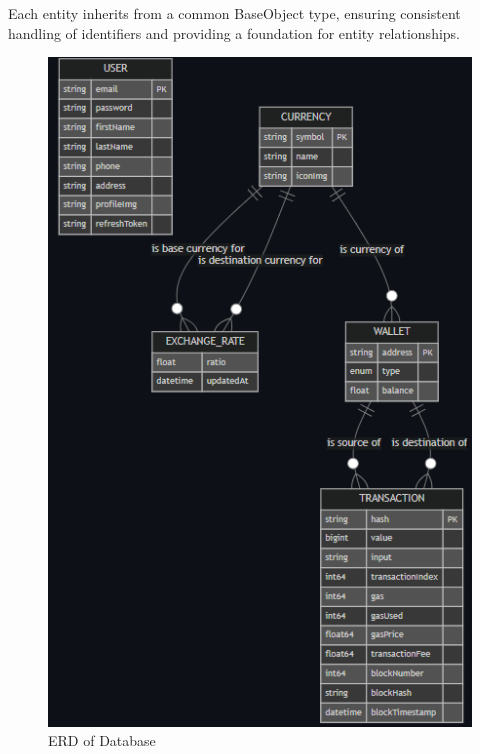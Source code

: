 Each entity inherits from a common BaseObject type, ensuring consistent handling of identifiers and providing a foundation for entity relationships.
\newpage
\begin{figure}[H]
    \centering
    \includegraphics[width= 1\textwidth]{figures/ERD diagram.png}
     \caption{ERD of Database}
    \label{fig:ERD}
\end{figure}
